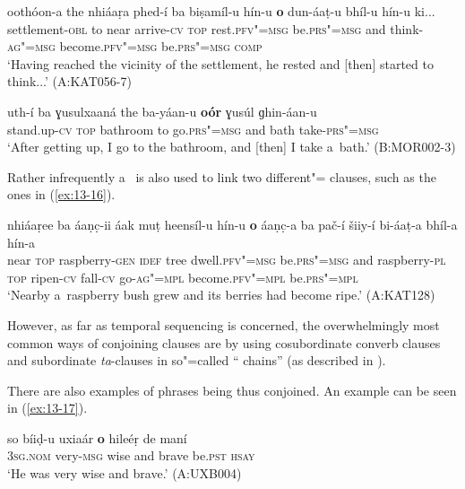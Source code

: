 \begin{exe}
\ex
\label{ex:13-14}
\gll oothóon-a the nhiáaṛa phed-í ba {\ob}biṣamíl-u hín-u \textbf{o} dun-áaṭ-u bhíl-u hín-u{\cb} ki...\\
settlement-\textsc{obl} to near arrive-\textsc{cv} \textsc{top} rest.\textsc{pfv"=msg} be.\textsc{prs"=msg} and think-\textsc{ag"=msg} become.\textsc{pfv"=msg} be.\textsc{prs"=msg } \textsc{comp} \\
\glt `Having reached the vicinity of the settlement, he rested and [then] started to think...' (A:KAT056-7)

\ex
\label{ex:13-15}
\gll uth-í ba {\ob}ɣusulxaaná the ba-yáan-u \textbf{oór} ɣusúl ɡhin-áan-u{\cb} \\
stand.up-\textsc{cv} \textsc{top} bathroom to go.\textsc{prs"=msg}  and bath take-\textsc{prs"=msg} \\
\glt `After getting up, I go to the bathroom, and [then] I take a~bath.' (B:MOR002-3) 
\end{exe}

Rather infrequently a~ is also used to link two different"= clauses, such as the ones in (\ref{ex:13-16}).

\ea
\label{ex:13-16}
\gll nhiáaṛee ba {\ob}áaṇc̣-ii áak muṭ heensíl-u hín-u \textbf{o} áaṇc̣-a ba pač-í šiiy-í bi-áaṭ-a bhíl-a hín-a{\cb}\\
near \textsc{top} raspberry-\textsc{gen} \textsc{idef} tree dwell.\textsc{pfv"=msg}  be.\textsc{prs"=msg} and raspberry-\textsc{pl} \textsc{top} ripen-\textsc{cv} fall-\textsc{cv} go-\textsc{ag"=mpl} become.\textsc{pfv"=mpl} be.\textsc{prs"=mpl}\\
\glt `Nearby a~raspberry bush grew and its berries had become ripe.' (A:KAT128) 
\z

However, as far as temporal sequencing is concerned, the overwhelmingly most common ways of conjoining clauses are by using cosubordinate converb clauses and subordinate \textit{ta}-clauses in so"=called `` chains'' (as described in ).


There are also examples of   phrases being thus conjoined. An example can be seen in (\ref{ex:13-17}).

\begin{exe}
\ex
\label{ex:13-17}
\gll so bíiḍ-u {\ob}uxiaár \textbf{o} hileéṛ{\cb} de maní  \\
\textsc{3sg.nom} very-\textsc{msg} wise and brave be.\textsc{pst} \textsc{hsay} \\
\glt `He was very wise and brave.' (A:UXB004) 
\end{exe}

